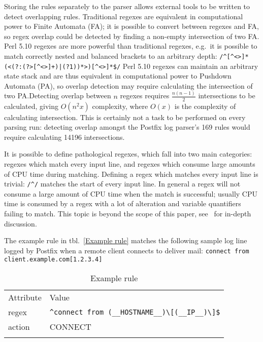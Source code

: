 \documentclass[draft]{svmult}
\newcommand{\tableline}[0]{%
    \noalign{\smallskip}%
    \hline%
    \noalign{\smallskip}%
}
\newcommand{\refwithlabel}[2]{%
    #1~\vref{#2}%
}
\newcommand{\tableref}[1]{%
    \refwithlabel{tbl.}{#1}%
}
\newcommand{\daemon}[1]{%
    \texttt{postfix/#1}%
}
\newcommand{\tab}[0]{%
    \hspace*{2em}%
}
\newcommand{\numberOFrules}[0]{%
    169%
}
\newcommand{\numberOFruleINTERSECTIONS}[0]{%
    14196%
}
\begin{document}
Storing the rules separately to the parser allows external tools to be
written to detect overlapping rules.  Traditional regexes are equivalent in
computational power to Finite Automata (FA); it is possible to convert
between regexes and FA, so regex overlap could be detected by finding a
non-empty intersection of two FA\@.  Perl 5.10 regexes are more powerful
than traditional regexes, e.g.\ it is possible to match correctly nested
and balanced brackets to an arbitrary depth:
\newline{}\tab{}\verb!/^[^<>]*(<(?:(?>[^<>]+)|(?1))*>)[^<>]*$/!\newline{}
Perl 5.10 regexes can maintain an arbitrary state stack and are thus
equivalent in computational power to Pushdown Automata (PA), so overlap
detection may require calculating the intersection of two PA.\@  Detecting
overlap between $n$ regexes requires $\frac{n(n-1)}{2}$ intersections to be
calculated, giving $O(n^2x)$ complexity, where $O(x)$ is the complexity of
calculating intersection.  This is certainly not a task to be performed on
every parsing run: detecting overlap amongst the Postfix log parser's
\numberOFrules{} rules would require calculating
\numberOFruleINTERSECTIONS{} intersections.

It is possible to define pathological regexes, which fall into two main
categories: regexes which match every input line, and regexes which consume
large amounts of CPU time during matching.  Defining a regex which matches
every input line is trivial: \verb!/^/! matches the start of every input
line.  In general a regex will not consume a large amount of CPU time when
the match is successful; usually CPU time is consumed by a regex with a lot
of alteration and variable quantifiers failing to match.  This topic is
beyond the scope of this paper, see~\cite{mastering-regular-expressions}
for in-depth discussion.

The example rule in \tableref{Example rule} matches the following sample
log line logged by Postfix when a remote client connects to deliver mail:
\newline{}\tab{}\verb!connect from client.example.com[1.2.3.4]!

\begin{table}[htbp]
    \caption{Example rule}
    \empty{}\label{Example rule}
    \begin{tabular}[]{ll}
        \tableline{}%
        Attribute                 & Value                                            \\
        \tableline{}%
        regex                     & \verb!^connect from (__HOSTNAME__)\[(__IP__)\]$! \\
        action                    & CONNECT                                          \\
        \tableline{}%
    \end{tabular}
\end{table}
\end{document}

